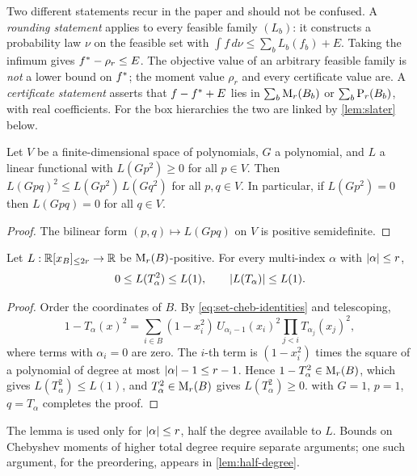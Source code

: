 Two different statements recur in the paper and should not be confused. A
\emph{rounding statement} applies to every feasible family $(L_b)$: it
constructs a probability law $\nu$ on the feasible set with
$\int f\,d\nu\le\sum_bL_b(f_b)+E$. Taking the infimum gives
$f^{*}-\rho_r\le E$. The objective value of an arbitrary feasible family is
\emph{not} a lower bound on $f^{*}$; the moment value $\rho_r$ and every
certificate value are. A \emph{certificate statement} asserts that
$f-f^{*}+E$ lies in $\sum_b\mathrm{M}_r(B_b)$ or $\sum_b\mathrm{P}_r(B_b)$, with real
coefficients. For the box hierarchies the two are linked by
\cref{lem:slater} below.

\begin{lemma}\label{lem:moment-cs}
Let $V$ be a finite-dimensional space of polynomials, $G$ a polynomial, and
$L$ a linear functional with $L(Gp^2)\ge0$ for all $p\in V$. Then
$L(Gpq)^2\le L(Gp^2)\,L(Gq^2)$ for all $p,q\in V$. In particular, if
$L(Gp^2)=0$ then $L(Gpq)=0$ for all $q\in V$.
\end{lemma}

\begin{proof}
The bilinear form $(p,q)\mapsto L(Gpq)$ on $V$ is positive semidefinite.
\end{proof}

\begin{lemma}\label{lem:cheb-moment}
Let $L:\mathbb{R}[x_B]_{\le 2r}\to\mathbb{R}$ be $\mathrm{M}_r(B)$-positive. For every multi-index
$\alpha$ with $\lvert \alpha\rvert\le r$,
\[
  0\le L(T_\alpha^2)\le L(1),\qquad \lvert L(T_\alpha)\rvert\le L(1).
\]
\end{lemma}

\begin{proof}
Order the coordinates of $B$. By \eqref{eq:set-cheb-identities} and
telescoping,
\begin{equation}\label{eq:set-telescope}
  1-T_\alpha(x)^2=\sum_{i\in B}(1-x_i^2)\,U_{\alpha_i-1}(x_i)^2
  \prod_{j<i}T_{\alpha_j}(x_j)^2,
\end{equation}
where terms with $\alpha_i=0$ are zero. The $i$-th term is $(1-x_i^2)$ times
the square of a polynomial of degree at most $\lvert \alpha\rvert-1\le r-1$. Hence
$1-T_\alpha^2\in\mathrm{M}_r(B)$, which gives $L(T_\alpha^2)\le L(1)$, and
$T_\alpha^2\in\mathrm{M}_r(B)$ gives $L(T_\alpha^2)\ge0$. 
with $G=1$, $p=1$, $q=T_\alpha$ completes the proof.
\end{proof}

The lemma is used only for $\lvert \alpha\rvert\le r$, half the degree available
to $L$. Bounds on Chebyshev moments of higher total degree require separate
arguments; one such argument, for the preordering, appears in
\cref{lem:half-degree}.

